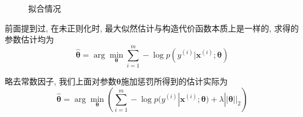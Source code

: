 \documentclass[a4paper,UTF8]{ctexart}
\theoremstyle{plain} \newtheorem{theorem}{定理}[section]
\theoremstyle{plain} \newtheorem{definition}{定义}[section]
\theoremstyle{plain} \newtheorem{lemma}{引理}[section]
\theoremstyle{plain} \newtheorem{proposition}{命题}[section]
\theoremstyle{plain} \newtheorem{example}{例}[section]
\theoremstyle{plain} \newtheorem{remark}{注}[section]
\theoremstyle{plain} \newtheorem{corollary}{推论}[section]
\begin{document}
\begin{figure}[!htb]
	\centering
	\hspace{0.3in}
	\hspace{0.3in}
	\caption{拟合情况}
	\label{logistic_fit}
\end{figure}


前面提到过, 在未正则化时, 最大似然估计与构造代价函数本质上是一样的, 求得的参数估计均为
\begin{equation*}
\hat{\bm{\theta}} = \arg \min_{\bm{\theta}} \sum_{i=1}^{m} - \log p(y^{(i)} | \bm{x}^{(i)}; \bm{\theta})
\end{equation*}

略去常数因子, 我们上面对参数$\bm{\theta}$施加惩罚所得到的估计实际为
\begin{equation*}
\hat{\bm{\theta}} = \arg \min_{\bm{\theta}} \left( \sum_{i=1}^{m} - \log p(y^{(i)} | \bm{x}^{(i)}; \bm{\theta}) + \lambda ||\bm{\theta}||_{2} \right)
\end{equation*}
\end{document}
